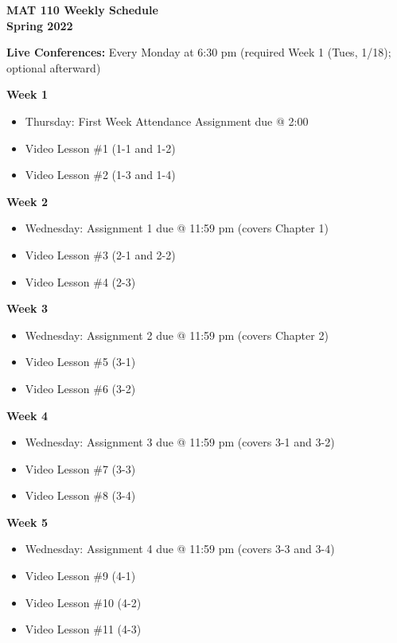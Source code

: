 \documentclass[12pt]{letter}
\author{Jacob Ayers}
\newcommand{\?}{\stackrel{?}{=}}
\begin{document}
	
	\begin{center}
		\textbf{MAT 110 Weekly Schedule \\ Spring 2022}
	\end{center}
	\textbf{Live Conferences:} Every Monday at 6:30 pm (required Week 1 (Tues, 1/18); optional afterward)
	
	\textbf{Week 1} \begin{itemize} \vspace{-12pt}
		\item Thursday: First Week Attendance Assignment due @ 2:00
		\item Video Lesson \#1 (1-1 and 1-2)
		\item Video Lesson \#2 (1-3 and 1-4)
	\end{itemize}

	\textbf{Week 2} \begin{itemize} \vspace{-12pt}
		\item Wednesday: Assignment 1 due @ 11:59 pm (covers Chapter 1)
		\item Video Lesson \#3 (2-1 and 2-2)
		\item Video Lesson \#4 (2-3)
	\end{itemize}

	\textbf{Week 3} \begin{itemize} \vspace{-12pt}
		\item Wednesday: Assignment 2 due @ 11:59 pm (covers Chapter 2)
		\item Video Lesson \#5 (3-1)
		\item Video Lesson \#6 (3-2)
	\end{itemize}

	\textbf{Week 4} \begin{itemize} \vspace{-12pt}
		\item Wednesday: Assignment 3 due @ 11:59 pm (covers 3-1 and 3-2)
		\item Video Lesson \#7 (3-3)
		\item Video Lesson \#8 (3-4)
	\end{itemize}

	\textbf{Week 5} \begin{itemize} \vspace{-12pt}
		\item Wednesday: Assignment 4 due @ 11:59 pm (covers 3-3 and 3-4)
		\item Video Lesson \#9 (4-1)
		\item Video Lesson \#10 (4-2)
		\item Video Lesson \#11 (4-3)
	\end{itemize}
\end{document}
